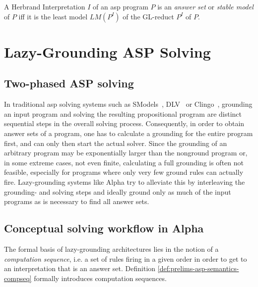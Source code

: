 \begin{definition}
\label{def:prelims-asp-semantics-answer-set}
A Herbrand Interpretation $I$ of an \gls{asp} program $P$ is an \emph{answer set} or \emph{stable model} of $P$ iff it is the least model $LM(P^I)$ of the GL-reduct $P^I$ of $P$.
\end{definition}

\section{Lazy-Grounding ASP Solving}

\subsection{Two-phased ASP solving}
In traditional \gls{asp} solving systems such as SModels~\cite{smodels}, DLV~\cite{dlv} or Clingo~\cite{clingo}, grounding an input program and solving the resulting propositional program are distinct sequential steps in the overall solving process. Consequently, in order to obtain answer sets of a program, one has to calculate a grounding for the entire program first, and can only then start the actual solver. Since the grounding of an arbitrary program may be exponentially larger than the nonground program or, in some extreme cases, not even finite, calculating a full grounding is often not feasible, especially for programs where only very few ground rules can actually fire. Lazy-grounding systems like Alpha try to alleviate this by interleaving the grounding- and solving steps and ideally ground only as much of the input programs as is necessary to find all answer sets.

\subsection{Conceptual solving workflow in Alpha}

The formal basis of lazy-grounding architectures lies in the notion of a \emph{computation sequence}, i.e. a set of rules firing in a given order in order to get to an interpretation that is an answer set. Definition \ref{def:prelims-asp-semantics-compseq} formally introduces computation sequences.

